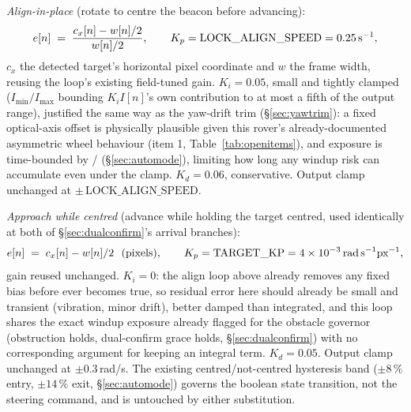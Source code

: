 \emph{Align-in-place} (rotate to centre the beacon before advancing):
\begin{equation}
e[n] \;=\; \frac{c_x[n] - w[n]/2}{w[n]/2}, \qquad K_p = \text{LOCK\_ALIGN\_SPEED} = 0.25\text{\,s}^{-1},
\end{equation}
$c_x$ the detected target's horizontal pixel coordinate and $w$ the frame
width, reusing the loop's existing field-tuned gain. $K_i = 0.05$, small
and tightly clamped ($I_{\min}/I_{\max}$ bounding $K_i I[n]$'s own
contribution to at most a fifth of the output range), justified the same
way as the yaw-drift trim (\S\ref{sec:yawtrim}): a fixed optical-axis
offset is physically plausible given this rover's already-documented
asymmetric wheel behaviour (item 1, Table~\ref{tab:openitems}), and
exposure is time-bounded by /
(\S\ref{sec:automode}), limiting how long any windup risk can accumulate
even under the clamp. $K_d = 0.06$, conservative. Output clamp unchanged
at $\pm\,\text{LOCK\_ALIGN\_SPEED}$.

\emph{Approach while centred} (advance while holding the target centred,
used identically at both of \S\ref{sec:dualconfirm}'s arrival branches):
\begin{equation}
e[n] \;=\; c_x[n] - w[n]/2 \ \ \text{(pixels)}, \qquad K_p = \text{TARGET\_KP} = 4\times10^{-3}\text{\,rad\,s}^{-1}\text{px}^{-1},
\end{equation}
gain reused unchanged. $K_i = 0$: the align loop above already removes
any fixed bias before  ever becomes true, so residual
error here should already be small and transient (vibration, minor
drift), better damped than integrated, and this loop shares the exact
windup exposure already flagged for the obstacle governor (obstruction
holds, dual-confirm grace holds, \S\ref{sec:dualconfirm}) with no
corresponding argument for keeping an integral term. $K_d = 0.05$.
Output clamp unchanged at $\pm 0.3$\,rad/s. The existing centred/not-centred
hysteresis band ($\pm 8\,\%$ entry, $\pm 14\,\%$ exit,
\S\ref{sec:automode}) governs the boolean state transition, not the
steering command, and is untouched by either substitution.


